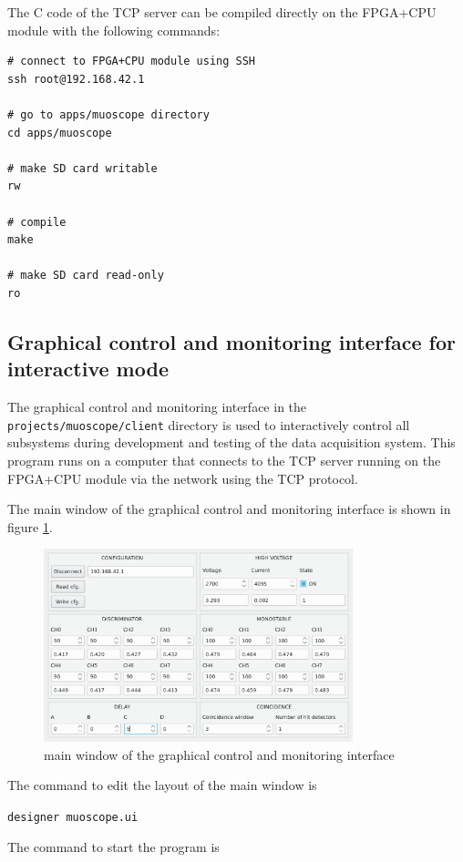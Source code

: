 \documentclass[12pt, a4paper]{article}
\begin{document}
The C code of the TCP server can be compiled directly on the FPGA+CPU module with the following commands:
\vspace{-1ex}
\begin{verbatim}
# connect to FPGA+CPU module using SSH
ssh root@192.168.42.1

# go to apps/muoscope directory
cd apps/muoscope

# make SD card writable
rw

# compile
make

# make SD card read-only
ro
\end{verbatim}

\subsection{Graphical control and monitoring interface for interactive mode}

The graphical control and monitoring interface in the \texttt{projects/muoscope/client} directory is used to interactively control all subsystems during development and testing of the data acquisition system. This program runs on a computer that connects to the TCP server running on the FPGA+CPU module via the network using the TCP protocol.

The main window of the graphical control and monitoring interface is shown in figure \ref{fig:gui}.

\begin{figure}[h!]
  \centering
  \includegraphics[width=0.8\textwidth]{images/gui.png}
  \caption{main window of the graphical control and monitoring interface}
  \label{fig:gui}
\end{figure}

The command to edit the layout of the main window is

\texttt{designer muoscope.ui}

The command to start the program is
\end{document}

